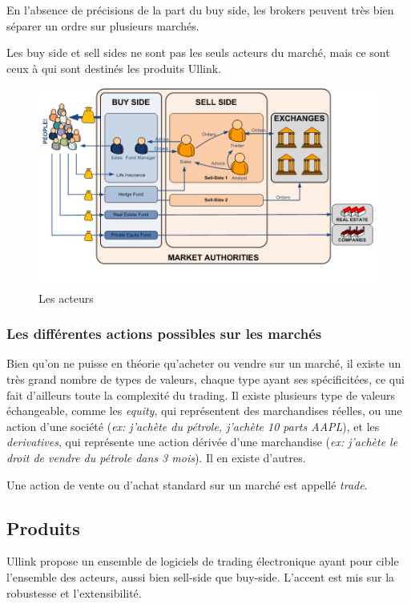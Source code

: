 \documentclass[a4paper, 12pt]{article}
\begin{document}
En l'absence de précisions de la part du buy side, les brokers peuvent très bien séparer un ordre sur plusieurs marchés.

Les buy side et sell sides ne sont pas les seuls acteurs du marché, mais ce sont ceux à qui sont destinés les produits Ullink.

\begin{figure}
\includegraphics[width=\textwidth]{market_actors.png}
\caption{Les acteurs}
\label{market_actors}
\end{figure}

\subsubsection{Les différentes actions possibles sur les marchés}

Bien qu'on ne puisse en théorie qu'acheter ou vendre sur un marché, il existe un très grand nombre de types de valeurs, chaque type ayant ses spécificitées, ce qui fait d'ailleurs toute la complexité du trading. Il existe plusieurs type de valeurs échangeable, comme les \emph{equity}, qui représentent des marchandises réelles, ou une action d'une société (\emph{ex: j'achète du pétrole, j'achète 10 parts AAPL}), et les \emph{derivatives}, qui représente une action dérivée d'une marchandise (\emph{ex: j'achète le droit de vendre du pétrole dans 3 mois}). Il en existe d'autres.

Une action de vente ou d'achat standard sur un marché est appellé \emph{trade}.

\subsection{Produits}

Ullink propose un ensemble de logiciels de trading électronique ayant pour cible l'ensemble des acteurs, aussi bien sell-side que buy-side. L'accent est mis sur la robustesse et l'extensibilité.
\end{document}
